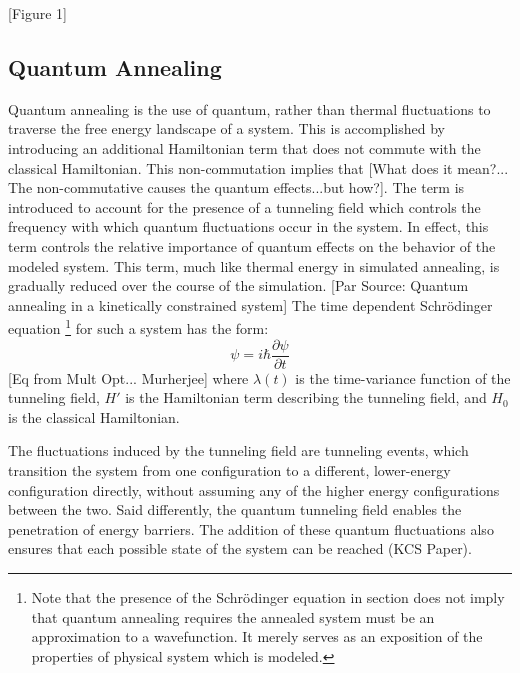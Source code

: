 \documentclass[11pt]{afthesis}
\begin{document}
	[Figure 1] 
	
	
	
	\subsection{Quantum Annealing}
	
	Quantum annealing is the use of quantum, rather than thermal fluctuations to traverse the free energy landscape of a system. This is accomplished by introducing an additional Hamiltonian term that does not commute with the classical Hamiltonian. This non-commutation implies that [What does it mean?... The non-commutative causes the quantum effects...but how?].  The term is introduced to account for the presence of a tunneling field which controls the frequency with which quantum fluctuations occur in the system. In effect, this term controls the relative importance of quantum effects on the behavior of the modeled system. This term, much like thermal energy in simulated annealing, is gradually reduced over the course of the simulation. [Par Source: Quantum annealing in a kinetically constrained system] The time dependent Schrödinger equation \footnote{Note that the presence of the Schrödinger equation in section does not imply that quantum annealing requires the annealed system must be an approximation to a wavefunction. It merely serves as an exposition of the properties of physical system which is modeled.} for such a system has the form: \begin{equation}
	[\lambda(t)H' + H_0]\psi = i\hbar \frac{\partial \psi}{\partial t}
	\end{equation} [Eq from Mult Opt... Murherjee] where \begin{math} \lambda(t) \end{math} is the time-variance function of the tunneling field, \begin{math} H' \end{math} is the Hamiltonian term describing the tunneling field, and \begin{math} H_0 \end{math} is the classical Hamiltonian. 
	
	The fluctuations induced by the tunneling field are tunneling events, which transition the system from one configuration to a different, lower-energy configuration directly, without assuming any of the higher energy configurations between the two. Said differently, the quantum tunneling field enables the penetration of energy barriers. The addition of these quantum fluctuations also ensures that each possible state of the system can be reached (KCS Paper). 
	
\end{document}
